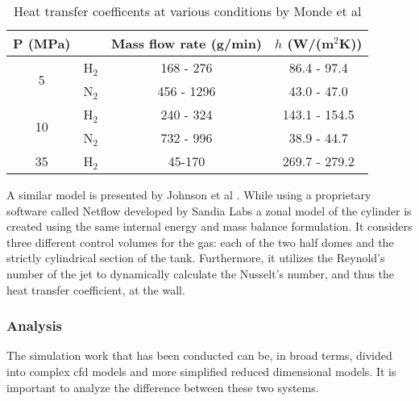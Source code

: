 \begin{table}[H]
\centering
\begin{small}
  \begin{tabular}{@{} cccc @{}}
    \toprule
    P (MPa) &  & Mass flow rate (g/min) & $h$ (W/(m$^2$K)) \\ 
    \midrule
     \multirow{2}{*}{5} & H$_2$ & 168 - 276 & 86.4 - 97.4 \\ 
     & N$_2$ & 456 - 1296 & 43.0 - 47.0 \\ 
     \multirow{2}{*}{10} & H$_2$& 240 - 324 & 143.1 - 154.5 \\ 
     & N$_2$  & 732 - 996 & 38.9 - 44.7 \\ 
    35 & H$_2$ & 45-170 & 269.7 - 279.2 \\ 
    \bottomrule
  \end{tabular}
\end{small}
\caption{Heat transfer coefficents at various conditions by Monde et al \cite{Monde2007}}
\label{tab:mondeHValues}
\end{table}


A similar model is presented by Johnson et al \cite{Johnson2015}. While using a proprietary software called Netflow developed by Sandia Labs  a zonal model of the cylinder is created using the same internal energy and mass balance formulation. It considers three different control volumes for the gas: each of the two half domes and the strictly cylindrical section of the tank. Furthermore, it utilizes the Reynold's number of the jet to dynamically calculate the Nusselt's number, and thus the heat transfer coefficient, at the wall.

\subsubsection{Analysis}


The simulation work that has been conducted can be, in broad terms, divided into complex \gls{cfd} models and more simplified reduced dimensional models. It is important to analyze the difference between these two systems. 


